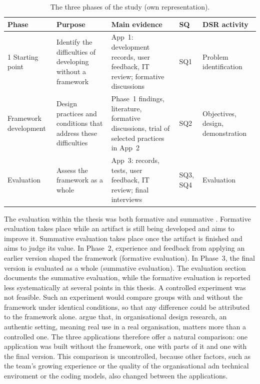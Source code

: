 \documentclass[10pt,a4paper]{article}
\begin{document}
\begin{table}[H]
\centering\small
\caption{The three phases of the study (own representation).}
\label{tab:phases}
\begin{tabular}{@{}p{.17\linewidth}p{.25\linewidth}p{.30\linewidth}p{.08\linewidth}p{.12\linewidth}@{}}
\toprule
\textbf{Phase} & \textbf{Purpose} & \textbf{Main evidence} & \textbf{SQ} & \textbf{DSR activity} \\
\midrule
1 Starting point & Identify the difficulties of developing without a framework & App~1: development records, user feedback, IT review; formative discussions & SQ1 & Problem identification \\
\addlinespace
2 Framework development & Design practices and conditions that address these difficulties & Phase~1 findings, literature, formative discussions, trial of selected practices in App~2 & SQ2 & Objectives, design, demonstration \\
\addlinespace
3 Evaluation & Assess the framework as a whole & App~3: records, tests, user feedback, IT review; final interviews & SQ3, SQ4 & Evaluation \\
\bottomrule
\end{tabular}
\end{table}
 
The evaluation within the thesis was both formative and summative
\parencite{sein2011adr,venable2016feds}. Formative evaluation
takes place while an artifact is still being developed and aims to
improve it. Summative evaluation takes place once the artifact
is finished and aims to judge its value. In Phase~2, experience and
feedback from applying an earlier version shaped the framework
(formative evaluation). In Phase~3, the final version is evaluated as a
whole (summative evaluation). The evaluation section documents the summative evaluation, while the formative evaluation is reported less systematically at several points in this thesis. A controlled experiment was not
feasible. Such an experiment would compare groups with and without the
framework under identical conditions, so that any difference could be
attributed to the framework alone. \textcite{sein2011adr} argue that,
in organisational design research, an authentic setting, meaning
real use in a real organisation, matters more than a controlled one.
The three applications therefore offer a natural comparison:
one application was built without the framework, one with parts of it
and one with the final version. This comparison is uncontrolled,
because other factors, such as the team's growing experience or the quality of the organisational adn technical enviroment or the coding models, also
changed between the applications.
\end{document}
